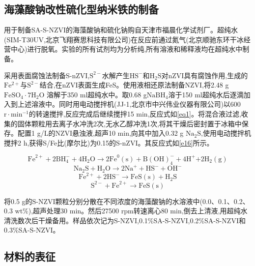 

\subsection{海藻酸钠改性硫化型纳米铁的制备}\label{material}

用于制备SA-S-NZVI的海藻酸钠和硫化钠购自天津市福晨化学试剂厂。超纯水(SIM-T30UV,北京飞翔赛思科技有限公司)在反应前通过氮气(北京顺驰东环干冰经营中心)进行脱氧。实验的所有试剂均为分析纯,所有溶液和稀释液均在超纯水中制备。

采用表面腐蚀法制备S-nZVI,$\mathrm{S^{2-}}$水解产生$\mathrm{HS^-}$和$\mathrm{H_2S}$对nZVI具有腐蚀作用,生成的$\mathrm{Fe^{2+}}$与$\mathrm S^{2-}$结合,在nZVI表面生成FeS\cite{ ISI:000382805800072}。使用液相还原法制备NZVI\cite{2020The,LIU2019124193},将2.48 g$\mathrm{FeSO_4\cdot 7H_2O}$ 溶解于350 ml超纯水中。取0.68 g$\mathrm{NaBH_4}$溶于150 ml超纯水后逐滴加入到上述溶液中。同时用电动搅拌机(JJ-1,北京市中兴伟业仪器有限公司)以600 $\mathrm{r\cdot min^{-1}}$的转速搅拌,反应完成后继续搅拌15 min,反应式如\cref{eq1}。将混合液过滤,收集的固体颗粒用去离子水冲洗2次,无水乙醇冲洗1次,将其干燥后密封置于冰箱中保存。配置1 g/L的NZVI悬浊液,超声10 min,向其中加入0.32 g $\mathrm{{Na}_2S}$,使用电动搅拌机搅拌2 h,获得S/Fe比(摩尔比)为0.15的S-nZVI。其反应式如\cref{e16}所示\cite{ ISI:000355774400014}。

\begin{equation}\label{eq1}
    \mathrm{{Fe}^{2+}+2{BH}_4^-+4H_2O}\rightarrow \mathrm{2{Fe}^0\left(s\right)+{B\left(OH\right)}_4^-+4H^+}\mathrm{+2H_2\left(g\right)}
\end{equation}
\begin{equation}
    \mathrm{{Na}_2S+H_2O\rightarrow2{Na}^++{HS}^-+{OH}^-}
\end{equation}
\begin{equation}
    \mathrm{{Fe}^{2+}+2{HS}^-\rightarrow FeS(s)+H_2S}
\end{equation}
\begin{equation}\label{e16}
    \mathrm{S^{2-}+{Fe}^{2+}\rightarrow FeS(s)}
\end{equation}

将0.5 g的S-NZVI颗粒分别分散在不同浓度的海藻酸钠的水溶液中(0.0、0.1、0.2、0.3 wt\%),超声处理30 min。然后27500 rpm转速离心80 min,倒去上清液,用超纯水清洗数次后干燥备用。样品依次记为S-NZVI,0.1\%SA-S-NZVI,0.2\%SA-S-NZVI和0.3\%SA-S-NZVI。

\subsection{材料的表征}

